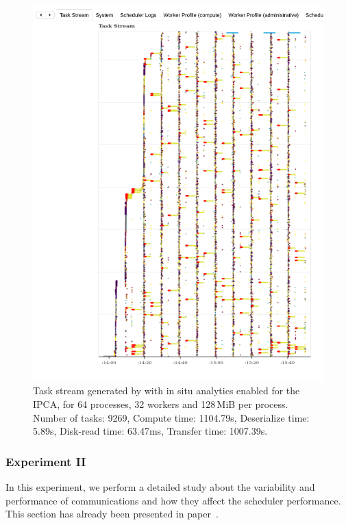 \begin{figure}[h!]\centering
\includegraphics[width=\columnwidth]{figures/P64_W32_D128_DEISA.pdf}
\caption{Task stream generated by \dask with in situ analytics enabled for the IPCA, for 64 processes, 32 workers and 128\,MiB per process.
    Number of tasks: 9269,
    Compute time: 1104.79s,
    Deserialize time: 5.89s,
    Disk-read time: 63.47ms,
    Transfer time: 1007.39s.}
\label{fig:taskstreamdeisa}
\end{figure}


\subsubsection{Experiment II}\label{XP2}

In this experiment, we perform a detailed study about the variability and performance of \deisa communications and how they affect the scheduler performance. This section has already been presented in paper~\cite{deisa}.


